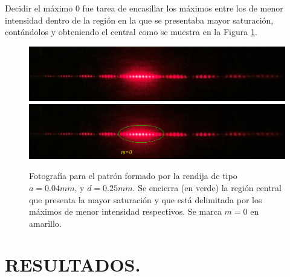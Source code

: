 \documentclass[12pt,a4paper]{article}
\begin{document}
\newpage
Decidir el máximo 0 fue tarea de encasillar los máximos entre los de menor intensidad dentro de la región en la que se presentaba mayor saturación, contándolos y obteniendo el central como se muestra en la Figura \ref{fig:patron}.
\begin{figure}[hbtp!]
	\centering
	\includegraphics[width= 0.7 \linewidth]{2_METODO/image_5}
	\includegraphics[width= 0.7 \linewidth]{2_METODO/image_6_1}
	\caption{Fotografía para el patrón formado por la rendija de tipo \(a= 0.04mm\), y \(d=0.25mm\). Se encierra (en verde) la región central que presenta la mayor saturación y que está delimitada por los máximos de menor intensidad respectivos. Se marca \(m=0\) en amarillo.}
	\label{fig:patron}
\end{figure}

\section{RESULTADOS.} %
\end{document}

